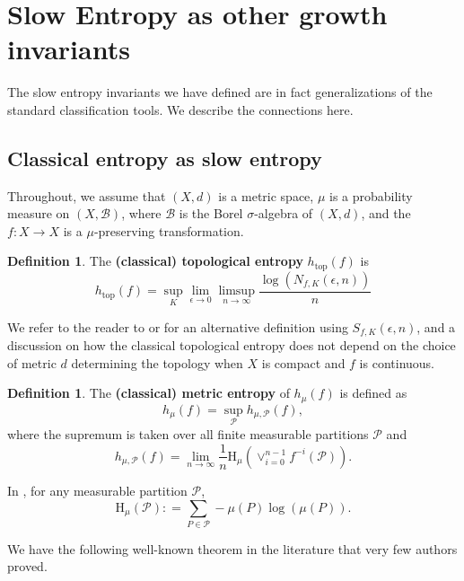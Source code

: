 \documentclass[oneside]{amsart}
\theoremstyle{plain}
\theoremstyle{definition}
\newtheorem{DEF}[THM]{Definition}
\newcommand{\dfn}{\mathrel{\mathop:}=}
\newcommand{\<}{\langle}
\renewcommand{\>}{\rangle}
\renewcommand{\P}{\mathcal{P}}
\newcommand{\B}{\mathcal{B}}
\newcommand{\e}{\epsilon}
\newcommand{\HH}{\text{H}}
\newcommand{\topo}{\operatorname{top}}
\renewcommand{\|}{|\!|} %
\begin{document}
\section{Slow Entropy as other growth invariants}
\label{sec:coincide}
The slow entropy invariants we have defined are in fact generalizations of the standard classification tools. We describe the connections here.

\subsection{Classical entropy as slow entropy}
\label{sec:classical}

Throughout, we assume that $(X,d)$ is a metric space, $\mu$ is a probability measure on $(X,\B)$, where $\B$ is the Borel $\sigma$-algebra of $(X,d)$, and the $f: X \to X$ is a $\mu$-preserving transformation. 
\begin{DEF}
The {\bf (classical) topological entropy} $h_{\topo}(f)$ is 
\begin{equation}
    h_{\topo}(f) = \sup_{K}\lim_{\e \to 0}\limsup_{n\to\infty}\frac{\log(N_{f,K}(\e,n))}{n}
    \label{eq:TopEntropy}
\end{equation}
\end{DEF}


We refer to the reader to \cite[Section 3.1.b]{hasselblatt-katok} or \cite{Bowen} for an alternative definition using $S_{f,K}(\e,n)$, and a discussion on how the classical topological entropy does not depend on the choice of metric $d$ determining the topology when $X$ is compact and $f$ is continuous. 


\begin{DEF}
    The {\bf (classical) metric entropy} of $h_\mu(f)$ is defined as
    \begin{equation}
        h_\mu(f)= \sup_{\P} h_{\mu,\P}(f),
    \end{equation}
    where the supremum is taken over all finite measurable partitions $\P$ and
    \begin{equation}
        h_{\mu,\P}(f) = \lim_{n \to \infty} \frac{1}{n}\HH_\mu(\vee_{i=0}^{n-1} f^{-i}(\P)).
 \label{eq:defofmetricentropy}
    \end{equation}
\end{DEF}
In , for any measurable partition $\P$, $$\HH_\mu(\P)\dfn\sum_{P \in \P}-\mu(P)\log(\mu(P)).$$


We have the following well-known theorem in the literature that very few authors proved.
\end{document}
